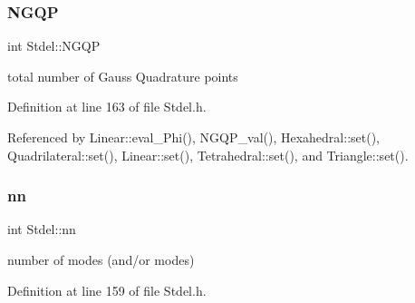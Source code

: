 \mbox{\label{classStdel_aa3cff31280606cd3eb95af770dd6f5b4}} 
\subsubsection{\texorpdfstring{N\+G\+QP}{NGQP}}
{\footnotesize\ttfamily int Stdel\+::\+N\+G\+QP\hspace{0.3cm}{\ttfamily [protected]}}



total number of Gauss Quadrature points 



Definition at line 163 of file Stdel.\+h.



Referenced by Linear\+::eval\+\_\+\+Phi(), N\+G\+Q\+P\+\_\+val(), Hexahedral\+::set(), Quadrilateral\+::set(), Linear\+::set(), Tetrahedral\+::set(), and Triangle\+::set().

\mbox{\label{classStdel_af4d02765d362e2f0469633ff78734f89}} 
\subsubsection{\texorpdfstring{nn}{nn}}
{\footnotesize\ttfamily int Stdel\+::nn\hspace{0.3cm}{\ttfamily [protected]}}



number of modes (and/or modes) 



Definition at line 159 of file Stdel.\+h.



